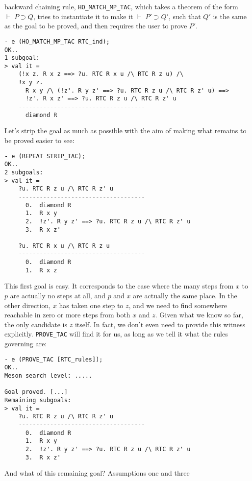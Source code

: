 backward chaining rule, \texttt{HO\_MATCH\_MP\_TAC}, which takes a
theorem of the form $\vdash\;P\supset Q$, tries to instantiate it to
make it $\vdash\;P'\supset Q'$, such that $Q'$ is the same as the goal
to be proved, and then requires the user to prove $P'$.
\begin{session}
\begin{verbatim}
- e (HO_MATCH_MP_TAC RTC_ind);
OK..
1 subgoal:
> val it =
    (!x z. R x z ==> ?u. RTC R x u /\ RTC R z u) /\
    !x y z.
      R x y /\ (!z'. R y z' ==> ?u. RTC R z u /\ RTC R z' u) ==>
      !z'. R x z' ==> ?u. RTC R z u /\ RTC R z' u
    ------------------------------------
      diamond R
\end{verbatim}
\end{session}
Let's strip the goal as much as possible with the aim of making what
remains to be proved easier to see:
\begin{session}
\begin{verbatim}
- e (REPEAT STRIP_TAC);
OK..
2 subgoals:
> val it =
    ?u. RTC R z u /\ RTC R z' u
    ------------------------------------
      0.  diamond R
      1.  R x y
      2.  !z'. R y z' ==> ?u. RTC R z u /\ RTC R z' u
      3.  R x z'

    ?u. RTC R x u /\ RTC R z u
    ------------------------------------
      0.  diamond R
      1.  R x z
\end{verbatim}
\end{session}
This first goal is easy.  It corresponds to the case where the many
steps from $x$ to $p$ are actually no steps at all, and $p$ and $x$
are actually the same place.  In the other direction, $x$ has taken
one step to $z$, and we need to find somewhere reachable in zero or
more steps from both $x$ and $z$.  Given what we know so far, the only
candidate is $z$ itself.  In fact, we don't even need to provide this
witness explicitly. \texttt{PROVE\_TAC} will find it for us, as long
as we tell it what the rules governing \con{RTC} are:
\begin{session}
\begin{verbatim}
- e (PROVE_TAC [RTC_rules]);
OK..
Meson search level: .....

Goal proved. [...]
Remaining subgoals:
> val it =
    ?u. RTC R z u /\ RTC R z' u
    ------------------------------------
      0.  diamond R
      1.  R x y
      2.  !z'. R y z' ==> ?u. RTC R z u /\ RTC R z' u
      3.  R x z'
\end{verbatim}
\end{session}
    And what of this remaining goal?  Assumptions one and three
